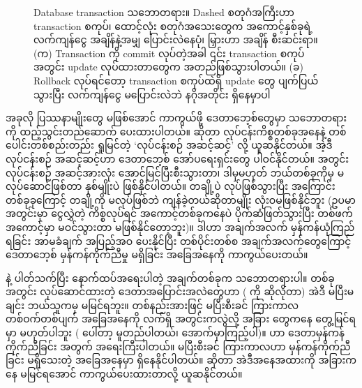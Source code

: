 \begin{figure}[thb!]%
\hfill%
\vspace{1\baselineskip}
%
\caption{Database transaction သဘောတရား။ Dashed စတုဂံအကြီးဟာ transaction စကုပ်၊ ထောင့်လုံး စတုဂံအသေးတွေက အကောင့်နှစ်ခုရဲ့ လက်ကျန်ငွေ အချိန်နဲ့အမျှ ပြောင်းလဲနေပုံ၊ မြှားဟာ အချိန် စီးဆင်းရာ။   (က) Transaction ကို commit လုပ်တဲ့အခါ ၎င်း transaction စကုပ် အတွင်း update လုပ်ထားတာတွေက အတည်ဖြစ်သွားပါတယ်။ (ခ) Rollback လုပ်ရင်တော့ transaction စကုပ်ထဲရှိ update တွေ ပျက်ပြယ်သွားပြီး လက်ကျန်ငွေ မပြောင်းလဲဘဲ နဂိုအတိုင်း ရှိနေမှာပါ}
\label{fig:a}
\end{figure}

အခုလို ပြဿနာမျိုးတွေ မဖြစ်အောင် ကာကွယ်ဖို့ ဒေတာဘေ့စ်တွေမှာ  သဘောတရားကို ထည့်သွင်းတည်ဆောက် ပေးထားပါတယ်။  ဆိုတာ လုပ်ငန်းကိစ္စတစ်ခုအနေနဲ့ တစ်ပေါင်းတစ်စည်းတည်း ရှုမြင်တဲ့ ‘လုပ်ငန်းစဉ် အဆင့်ဆင့်’ လို့ ယူဆနိုင်တယ်။ အဲ့ဒီ လုပ်ငန်းစဉ် အဆင့်ဆင့်ဟာ ဒေတာဘေ့စ်  အော်ပရေးရှင်းတွေ ပါဝင်နိုင်တယ်။  အတွင်း လုပ်ငန်းစဉ် အဆင့်အားလုံး အောင်မြင်ပြီးစီးသွားတာ၊ ဒါမှမဟုတ် ဘယ်တစ်ခုကိုမှ မလုပ်ဆောင်ဖြစ်တာ နှစ်မျိုးပဲ ဖြစ်နိုင်ပါတယ်။ တချို့ပဲ လုပ်ဖြစ်သွားပြီး အကြောင်း တစ်ခုခုကြောင့် တချို့ကို မလုပ်ဖြစ်ဘဲ ကျန်ခဲ့တယ်ဆိုတာမျိုး လုံးဝမဖြစ်နိုင်ဘူး (ဥပမာ  အတွင်းမှာ ငွေလွှဲတဲ့ ကိစ္စလုပ်ရင် အကောင့်တစ်ခုကနေပဲ ပိုက်ဆံဖြတ်သွားပြီး တစ်ဖက်အကောင့်မှာ မဝင်သွားတာ မဖြစ်နိုင်တော့ဘူး)။ ဒါဟာ အချက်အလက် မှန်ကန်ယုံကြည်ရခြင်း  အာမခံချက် အပြည့်အဝ ပေးနိုင်ပြီး တစ်ပိုင်းတစ်စ  အချက်အလက်တွေကြောင့် ဒေတာဘေ့စ် မှန်ကန်ကိုက်ညီမှု မရှိခြင်း အခြေအနေကို ကာကွယ်ပေးတယ်။





 နဲ့ ပါတ်သက်ပြီး နောက်ထပ်အရေးပါတဲ့ အချက်တစ်ခုက  သဘောတရားပါ။  တစ်ခုအတွင်း လုပ်ဆောင်ထားတဲ့ ဒေတာအပြောင်းအလဲတွေဟာ ( ကို ဆိုလိုတာ) အဲဒီ  မပြီးမချင်း ဘယ်သူကမှ မမြင်ရဘူး။ တစ်နည်းအားဖြင့်  မပြီးစီးခင် ကြားကာလ တစ်ဝက်တစ်ပျက် အခြေအနေကို လက်ရှိ  အတွင်းကလွဲလို့ အခြား  တွေကနေ တွေ့မြင်ရမှာ မဟုတ်ပါဘူး ( ပေါ်တာ့ မူတည်ပါတယ်၊ အောက်မှာကြည့်ပါ)။  ဟာ ဒေတာမှန်ကန်ကိုက်ညီခြင်း အတွက် အရေးကြီးပါတယ်။  မပြီးစီးခင် ကြားကာလဟာ မှန်ကန်ကိုက်ညီခြင်း မရှိသေးတဲ့ အခြေအနေမှာ ရှိနေနိုင်ပါတယ်။  ဆိုတာ အဲဒီအနေအထားကို အခြားကနေ မမြင်ရအောင် ကာကွယ်ပေးထားတာလို့ ယူဆနိုင်တယ်။ 

